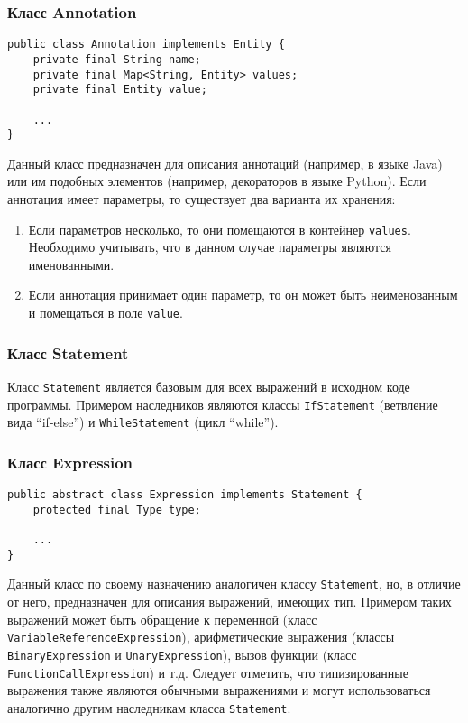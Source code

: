 \vspace{10pt}
\subsubsection{Класс Annotation}

\begin{lstlisting}[caption={Класс Annotation}]
public class Annotation implements Entity {
    private final String name;
    private final Map<String, Entity> values;
    private final Entity value;

    ...
}
\end{lstlisting}

Данный класс предназначен для описания аннотаций (например, в языке Java) или им
подобных элементов (например, декораторов в языке Python). Если аннотация имеет
параметры, то существует два варианта их хранения:

\begin{enumerate}
    \item Если параметров несколько, то они помещаются в контейнер
    \texttt{values}. Необходимо учитывать, что в данном случае параметры
    являются именованными.
    \item Если аннотация принимает один параметр, то он может быть неименованным
    и помещаться в поле \texttt{value}.
\end{enumerate}

\subsubsection{Класс Statement}

Класс \texttt{Statement} является базовым для всех выражений в исходном коде
программы. Примером наследников являются классы \texttt{IfStatement} (ветвление
вида ``if-else'') и \texttt{WhileStatement} (цикл ``while'').

\newpage
\subsubsection{Класс Expression}

\begin{lstlisting}[caption={Класс Expression}]
public abstract class Expression implements Statement {
    protected final Type type;

    ...
}
\end{lstlisting}

Данный класс по своему назначению аналогичен классу \texttt{Statement}, но, в
отличие от него, предназначен для описания выражений, имеющих тип. Примером
таких выражений может быть обращение к переменной (класс
\texttt{VariableReferenceExpression}), арифметические выражения (классы
\texttt{BinaryExpression} и \texttt{UnaryExpression}), вызов функции (класс
\texttt{FunctionCallExpression}) и т.д. Следует отметить, что типизированные
выражения также являются обычными выражениями и могут использоваться аналогично
другим наследникам класса \texttt{Statement}.

